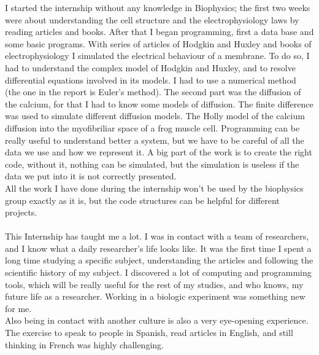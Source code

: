 \documentclass[a4paper,11pt]{report}
\begin{document}
I started the internship without any knowledge in Biophysics; the first two weeks were about understanding the cell structure and the electrophysiology laws by reading articles and books. After that I began programming, first a data base and some basic programs. With series of articles of Hodgkin and Huxley and books of electrophysiology \cite{Hodgkin1952} \cite{Tranquillo2009} \cite{Johnston1994} I simulated the electrical behaviour of a membrane. To do so, I had to understand the complex model of Hodgkin and Huxley, and to resolve differential equations involved in its models. I had to use a numerical method (the one in the report is Euler's method). The second part was the diffusion of the calcium, for that I had to know some models of diffusion. The finite difference was used to simulate different diffusion models. The Holly model of the calcium diffusion  into the myofibriliar space of a frog muscle cell. Programming can be really useful to understand better a system, but we have to be careful of all the data we use and how we represent it. A big part of the work is to create the right code, without it, nothing can be simulated, but the simulation is useless if the data we put into it is not correctly presented. \\
All the work I have done during the internship won't be used by the biophysics group exactly as it is, but the code structures can be helpful for different projects. 

\paragraph*{ } This Internship has taught me a lot. I was in contact with a team of researchers, and I know what a daily researcher's life looks like. It was the first time I spent a long time studying a specific subject, understanding the articles and following the scientific history of my subject. I discovered a lot of computing and programming tools, which will be really useful for the rest of my studies, and who knows, my future life as a researcher. Working in a biologic experiment was something new for me. \\
Also being in contact with another culture is also a very eye-opening experience. The exercise to speak to people in Spanish, read articles in English, and still thinking in French was highly challenging. 

\nopagebreak




\appendix
\end{document}
